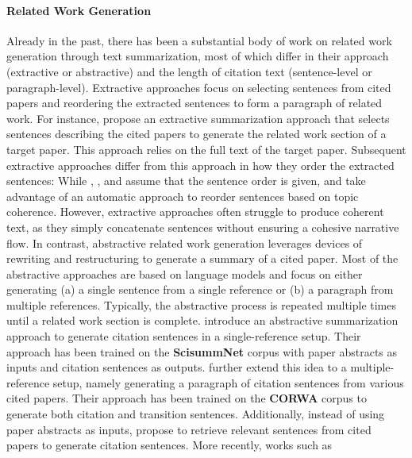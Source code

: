\paragraph{Related Work Generation} %

Already in the past, there has been a substantial body of work on related work generation through text summarization, most of which differ in their approach (extractive or abstractive) and the length of citation text (sentence-level or paragraph-level). Extractive approaches focus on selecting sentences from cited papers and reordering the extracted sentences to form a paragraph of related work. For instance, \citet{hoang-kan-2010-towards} propose an extractive summarization approach that selects sentences describing the cited papers to generate the related work section of a target paper. This approach relies on the full text of the target paper. Subsequent extractive approaches differ from this approach in how they order the extracted sentences: While \citet{wang-etal-2018-neural-related}, \citet{chen2019automatic}, and \citet{wang2019toc} assume that the sentence order is given,  \citet{hu2014automatic} and \citet{deng2021automatic} take advantage of an automatic approach to reorder sentences based on topic coherence. However, extractive approaches often struggle to produce coherent text, as they simply concatenate sentences without ensuring a cohesive narrative flow. In contrast, abstractive related work generation leverages devices of rewriting and restructuring to generate a summary of a cited paper. Most of the abstractive approaches are based on language models and focus on either generating (a) a single sentence from a single reference 
or (b) a paragraph from multiple references. Typically, the abstractive process is repeated multiple times until a related work section is complete.
\citet{abura2020automatic} introduce an abstractive summarization approach to generate citation sentences in a single-reference setup. Their approach has been trained on the \textbf{ScisummNet} corpus with paper abstracts as inputs and citation sentences as outputs. \citet{li-etal-2022-corwa} further extend this idea to a multiple-reference setup, namely generating a paragraph of citation sentences from various cited papers. Their approach has been trained on the \textbf{CORWA} corpus to generate both citation and transition sentences. Additionally, instead of using paper abstracts as inputs, \citet{li2024cited} propose to retrieve relevant sentences from cited papers to generate citation sentences. More recently, works such as \citet{sahinuc-etal-2024-systematic} 
